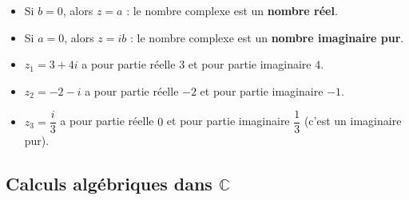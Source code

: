 \begin{rem}
	\nline
	\begin{itemize}
		\item Si $b = 0$, alors $z = a$ : le nombre complexe est un \textbf{nombre réel}.
		\item Si $a = 0$, alors $z = ib$ : le nombre complexe est un \textbf{nombre imaginaire pur}.
	\end{itemize}
\end{rem}

\begin{ex}
	\nline
	\begin{itemize}
		\item $z_1 = 3 + 4i$ a pour partie réelle $3$ et pour partie imaginaire $4$.
		\item $z_2 = -2 - i$ a pour partie réelle $-2$ et pour partie imaginaire $-1$.
		\item $z_3 = \dfrac{i}{3}$ a pour partie réelle $0$ et pour partie imaginaire $\dfrac{1}{3}$ (c'est un imaginaire pur).
	\end{itemize}
\end{ex}

\subsection{Calculs algébriques dans $\mathbb{C}$}

